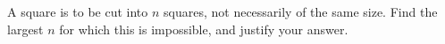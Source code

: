 A square is to be cut into $n$ squares, not necessarily of the same size. Find the largest $n$ for which this is impossible, and justify your answer.

